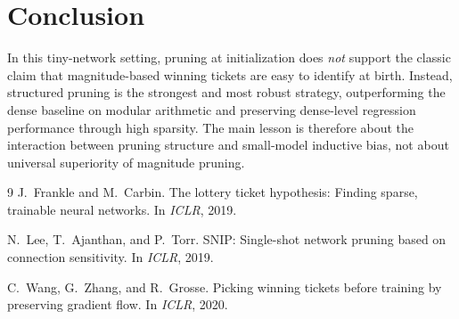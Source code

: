 \documentclass[11pt,a4paper]{article}
\begin{document}
\section{Conclusion}

In this tiny-network setting, pruning at initialization does \emph{not} support the classic claim that magnitude-based winning tickets are easy to identify at birth. Instead, structured pruning is the strongest and most robust strategy, outperforming the dense baseline on modular arithmetic and preserving dense-level regression performance through high sparsity. The main lesson is therefore about the interaction between pruning structure and small-model inductive bias, not about universal superiority of magnitude pruning.

\begin{thebibliography}{9}
J.~Frankle and M.~Carbin.
\newblock The lottery ticket hypothesis: Finding sparse, trainable neural networks.
\newblock In \emph{ICLR}, 2019.

N.~Lee, T.~Ajanthan, and P.~Torr.
\newblock SNIP: Single-shot network pruning based on connection sensitivity.
\newblock In \emph{ICLR}, 2019.

C.~Wang, G.~Zhang, and R.~Grosse.
\newblock Picking winning tickets before training by preserving gradient flow.
\newblock In \emph{ICLR}, 2020.
\end{thebibliography}
\end{document}
